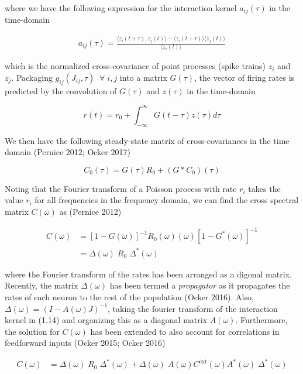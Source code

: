 \documentclass{ucetd}
\begin{document}
where we have the following expression for the interaction kernel $a_{ij}(\tau)$ in the time-domain

\begin{align}
a_{ij}(\tau) = \frac{\langle z_{i}(t+\tau), z_{j}(t)\rangle - \langle z_{i}(t+\tau)\rangle\langle z_{j}(t)\rangle}{\langle z_{i}(t)\rangle}
\end{align}

which is the normalized cross-covariance of point processes (spike trains) $z_{i}$ and $z_{j}$. Packaging $g_{ij}(J_{ij},\tau) \;\;\forall\; i,j$ into a matrix $G(\tau)$, the vector of firing rates is predicted by the convolution of $G(\tau)$ and $z(\tau)$ in the time-domain

\begin{equation}
r(t) = r_{0} + \int_{-\infty}^{\infty} G(t-\tau)z(\tau)d\tau
\end{equation}

We then have the following steady-state matrix of cross-covariances in the time domain (Pernice 2012; Ocker 2017)

\begin{equation}
C_{0}(\tau) = G(\tau)R_{0} + (G*C_{0})(\tau)
\end{equation} 

Noting that the Fourier transform of a Poisson process with rate $r_{i}$ takes the value $r_{i}$ for all frequencies in the frequency domain, we can find the cross spectral matrix $C(\omega)$ as (Pernice 2012)

\begin{align}
C(\omega) &= [1-G(\omega)]^{-1}R_{0}(\omega)(\omega)[1-G^{*}(\omega)]^{-1}\\
&= \Delta(\omega)\;R_{0}\;\Delta^{*}(\omega)
\end{align} 

where the Fourier transform of the rates has been arranged as a digonal matrix. Recently, the matrix $\Delta(\omega)$ has been termed a \emph{propagator} as it propagates the rates of each neuron to the rest of the population (Ocker 2016). Also, $\Delta(\omega) = (I - A(\omega)J)^{-1}$, taking the fourier transform of the interaction kernel in (1.14) and organizing this as a diagonal matrix $A(\omega)$. Furthermore, the solution for $C(\omega)$ has been extended to also account for correlations in feedforward inputs (Ocker 2015; Ocker 2016)

\begin{align}
C(\omega) &= \Delta(\omega)\;R_{0}\;\Delta^{*}(\omega) + \Delta(\omega)\;A(\omega)C^{\mathrm{ext}}(\omega)A^{*}(\omega)\;\Delta^{*}(\omega)
\end{align} 
\end{document}
